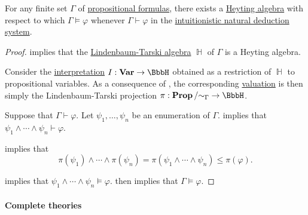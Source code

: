 \begin{theorem}\label{thm:intuitionistic_propositional_completeness}
  For any finite set \( \Gamma \) of \hyperref[def:propositional_syntax/formula]{propositional formulas}, there exists a \hyperref[def:heyting_algebra]{Heyting algebra} with respect to which \( \Gamma \vDash \varphi \) whenever \( \Gamma \vdash \varphi \) in the \hyperref[def:propositional_natural_deduction_systems]{intuitionistic natural deduction system}.
\end{theorem}
\begin{proof}
   implies that the \hyperref[def:lindenbaum_tarski_algebra]{Lindenbaum-Tarski algebra} \( \BbbH \) of \( \Gamma \) is a Heyting algebra.

  Consider the \hyperref[def:propositional_valuation/interpretation]{interpretation} \( I: \op*{Var} \to \BbbH \) obtained as a restriction of \( \BbbH \) to propositional variables. As a consequence of , the corresponding \hyperref[def:propositional_valuation/formula_valuation]{valuation} is then simply the Lindenbaum-Tarski projection \( \pi: \op*{Prop} / {\sim_\Gamma} \to \BbbH \).

  Suppose that \( \Gamma \vdash \varphi \). Let \( \psi_1, \ldots, \psi_n \) be an enumeration of \( \Gamma \).  implies that \( \psi_1 \wedge \cdots \wedge \psi_n \vdash \varphi \).

   implies that
  \begin{equation*}
    \pi(\psi_1) \wedge \cdots \wedge \pi(\psi_n)
    =
    \pi(\psi_1 \wedge \cdots \wedge \psi_n)
    \leq
    \pi(\varphi).
  \end{equation*}

   implies that \( \psi_1 \wedge \cdots \wedge \psi_n \vDash \varphi \).  then implies that \( \Gamma \vDash \varphi \).
\end{proof}

\paragraph{Complete theories}


